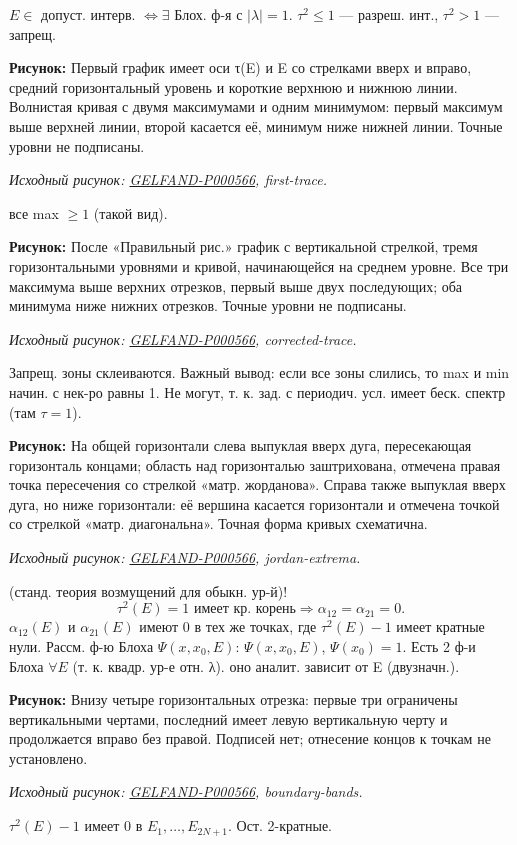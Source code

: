 \documentclass[11pt]{article}
\theoremstyle{definition}
\theoremstyle{remark}
\newcommand{\SourceFigure}[3]{%
  \par\begingroup\color{blue!60!black}\textbf{\hyperref[#1:source-page]{Source figure #1/#2}:} #3%
  \par\textit{Consult the authoritative scan at this locator.}\endgroup\par%
}
\renewcommand{\SourceFigure}[3]{%
  \par\begingroup\color{blue!55!black}\textbf{Рисунок:} #3%
  \par{\small\textit{Исходный рисунок: \hyperref[#1:source-page]{#1}, #2.}}%
  \endgroup\par%
}
\begin{document}
$E\in$ допуст. интерв. $\Leftrightarrow\exists$ Блох. ф-я с $|\lambda|=1$.
$\tau^2\leq1$ — разреш. инт., $\tau^2>1$ — запрещ.
\SourceFigure{GELFAND-P000566}{first-trace}{Первый график имеет оси τ(E) и E со стрелками вверх и вправо, средний горизонтальный уровень и короткие верхнюю и нижнюю линии. Волнистая кривая с двумя максимумами и одним минимумом: первый максимум выше верхней линии, второй касается её, минимум ниже нижней линии. Точные уровни не подписаны.}
все max $\geq1$ (такой вид).
\SourceFigure{GELFAND-P000566}{corrected-trace}{После «Правильный рис.» график с вертикальной стрелкой, тремя горизонтальными уровнями и кривой, начинающейся на среднем уровне. Все три максимума выше верхних отрезков, первый выше двух последующих; оба минимума ниже нижних отрезков. Точные уровни не подписаны.}
Запрещ. зоны склеиваются.
Важный вывод: если все зоны слились, то max и min начин. с нек-ро равны 1.
Не могут, т. к. зад. с периодич. усл. имеет беск. спектр (там $\tau=1$).
\SourceFigure{GELFAND-P000566}{jordan-extrema}{На общей горизонтали слева выпуклая вверх дуга, пересекающая горизонталь концами; область над горизонталью заштрихована, отмечена правая точка пересечения со стрелкой «матр. жорданова». Справа также выпуклая вверх дуга, но ниже горизонтали: её вершина касается горизонтали и отмечена точкой со стрелкой «матр. диагональна». Точная форма кривых схематична.}
(станд. теория возмущений для обыкн. ур-й)!
\begin{equation*}
\tau^2(E)=1\text{ имеет кр. корень}\Rightarrow\alpha_{12}=\alpha_{21}=0.
\end{equation*}
$\alpha_{12}(E)$ и $\alpha_{21}(E)$ имеют 0 в тех же точках, где $\tau^2(E)-1$ имеет кратные нули.
Рассм. ф-ю Блоха $\Psi(x,x_0,E)$: $\Psi(x,x_0,E)$, $\Psi(x_0)=1$.
Есть 2 ф-и Блоха $\forall E$ (т. к. квадр. ур-е отн. λ).
оно аналит. зависит от E (двузначн.).
\SourceFigure{GELFAND-P000566}{boundary-bands}{Внизу четыре горизонтальных отрезка: первые три ограничены вертикальными чертами, последний имеет левую вертикальную черту и продолжается вправо без правой. Подписей нет; отнесение концов к точкам не установлено.}
$\tau^2(E)-1$ имеет 0 в $E_1,\ldots,E_{2N+1}$. Ост. 2-кратные.
\end{document}
